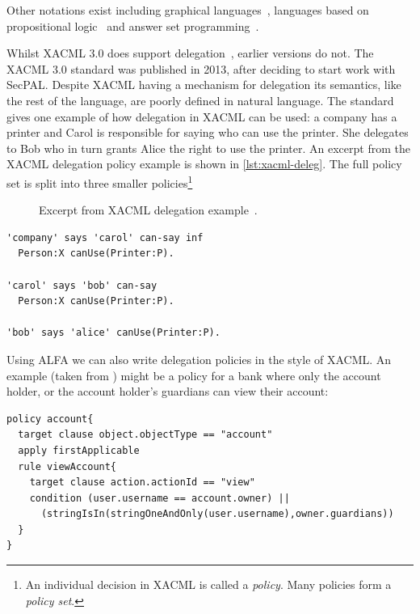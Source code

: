 \documentclass[thesis.tex]{subfiles}
\begin{document}
Other notations exist including graphical
languages~\cite{henrik_nergaard_scratch-based_2015}, languages based on
propositional logic~\cite{zhang_synthesising_2004} and answer set
programming~\cite{ramli_xacml_2012}.

Whilst XACML 3.0 does support delegation~\cite{oasis_xacml_2010}, earlier
versions do not. The XACML 3.0 standard was published in 2013, after deciding to
start work with SecPAL. Despite XACML having a mechanism for delegation its
semantics, like the rest of the language, are poorly defined in natural
language. The standard gives one example of how delegation in XACML can be used:
a company has a printer and Carol is responsible for saying who can use the
printer. She delegates to Bob who in turn grants Alice the right to use the
printer. An excerpt from the XACML delegation policy example is shown in
\autoref{lst:xacml-deleg}. The full policy set is split into three smaller
policies\footnote{An individual decision in XACML is called a \emph{policy}. Many policies form a \emph{policy set}.}

\begin{figure}
  \begin{minipage}{1\textwidth}
      
  \end{minipage}
  \caption[Excerpt from XACML delegation example.]{Excerpt from XACML delegation example~\cite{oasis_xacml_2010}.}
  \label{lst:xacml-deleg}
\end{figure}

\begin{lstlisting}
'company' says 'carol' can-say inf
  Person:X canUse(Printer:P).

'carol' says 'bob' can-say
  Person:X canUse(Printer:P).

'bob' says 'alice' canUse(Printer:P).
\end{lstlisting}

Using ALFA we can also write delegation policies in the style of
XACML.  An example (taken from \cite{axiomatics_going_2016}) might be
a policy for a bank where only the account holder, or the account
holder's guardians can view their account:

\begin{lstlisting}
policy account{ 
  target clause object.objectType == "account"
  apply firstApplicable
  rule viewAccount{ 
    target clause action.actionId == "view"
    condition (user.username == account.owner) ||
      (stringIsIn(stringOneAndOnly(user.username),owner.guardians))
  }
}
\end{lstlisting}
\end{document}
